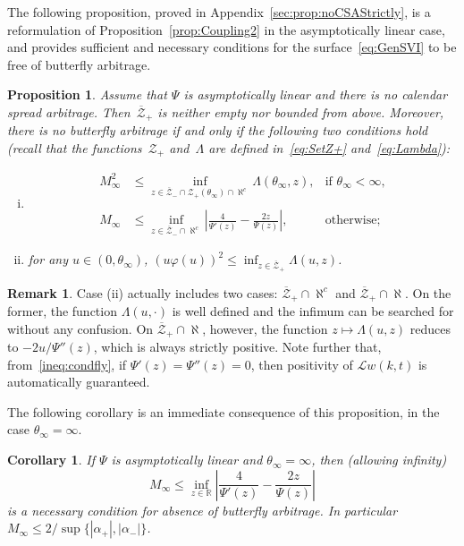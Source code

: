 \documentclass{amsart}[11pt]
\numberwithin{equation}{section}
\newtheorem{corollary}[theorem]{Corollary}
\newtheorem{proposition}[theorem]{Proposition}
\theoremstyle{definition}
\newtheorem{remark}[theorem]{Remark}
\newcommand{\Ll}{\mathcal{L}}
\newcommand{\Zz}{\mathcal{Z}}
\begin{document}
The following proposition, proved in Appendix~\ref{sec:prop:noCSAStrictly}, is a reformulation of Proposition~\ref{prop:Coupling2} %
in the asymptotically linear case, and provides sufficient and necessary conditions for the surface~\eqref{eq:GenSVI} to be free of butterfly arbitrage.
\begin{proposition} \label{prop:noCSAStrictly}
Assume that $\Psi$ is asymptotically linear and there is no calendar spread arbitrage. 
Then~$\overline{\Zz}_+$ is neither empty nor bounded from above.
Moreover, there is no butterfly arbitrage if and only if the following two conditions hold
(recall that the functions~$\Zz_+$ and~$\Lambda$ are defined in~\eqref{eq:SetZ+} and~\eqref{eq:Lambda}):
\begin{enumerate}[(i)]
\item 
\begin{equation*}
\begin{array}{lll}
M_\infty^2 & \displaystyle \leq \inf_{z \in \overline{\Zz}_- \cap \Zz_+(\theta_\infty)\cap\aleph^c}
\Lambda(\theta_\infty, z),
 & \text{if }\theta_\infty<\infty,\\
\\
M_\infty & \displaystyle \leq \inf_{z\in \overline{\Zz}_-\cap\aleph^c}\left|\frac{4}{\Psi'(z)}-\frac{2z}{\Psi(z)}\right|,
& \text{otherwise};
\end{array}
\end{equation*}
\item for any $u \in (0, \theta_\infty)$,
$\displaystyle (u \varphi(u))^2 \leq \inf_{z \in \overline{\Zz}_+} \Lambda(u, z)$.
\end{enumerate}
\end{proposition}
\begin{remark}
Case (ii) actually includes two cases:
$\overline{\Zz}_+\cap\aleph^c$ and $\overline{\Zz}_+\cap\aleph$.
On the former, the function $\Lambda(u,\cdot)$ is well defined and the infimum can be searched for without any confusion.
On $\overline{\Zz}_+\cap\aleph$, however, the function $z\mapsto\Lambda(u,z)$ reduces to $-2u/\Psi''(z)$,
which is always strictly positive.
Note further that, from~\eqref{ineq:condfly}, if $\Psi'(z) = \Psi''(z) = 0$, then positivity of $\Ll w(k,t)$
is automatically guaranteed.
\end{remark}
The following corollary is an immediate consequence of this proposition, in the case $\theta_\infty=\infty$.
\begin{corollary}\label{cor:EasyCondition1}
If $\Psi$ is asymptotically linear and $\theta_\infty=\infty$, then (allowing infinity)
$$
M_\infty \leq \inf_{z\in\mathbb{R}}\left|\frac{4}{\Psi'(z)}-\frac{2z}{\Psi(z)}\right|$$
is a necessary condition for absence of butterfly arbitrage.
In particular $M_\infty \leq 2/\sup\{|\alpha_+|, |\alpha_-|\}$.
\end{corollary}
\end{document}
